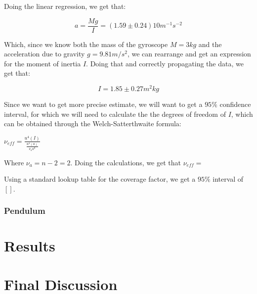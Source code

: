 \documentclass[a4paper,12pt]{article}
\begin{document}
Doing the linear regression, we get that:

\begin{equation}
  \label{result1}
  a = \frac{Mg}{I} = (1.59 \pm 0.24)10 m^{-1}s^{-2}
\end{equation}

Which, since we know both the mass of the gyroscope $M = 3kg$ and the acceleration due to gravity $g = 9.81 m/s^2$, we can rearrange and get an expression for the moment of inertia $I$. Doing that and correctly propagating the data, we get that:

\begin{equation}
  \label{Inertia1}
  I = 1.85 \pm 0.27 m^2kg
\end{equation}

Since we want to get more precise estimate, we will want to get a $95\%$ confidence interval, for which we will need to calculate the the degrees of freedom of $I$, which can be obtained through the Welch-Satterthwaite formula:

$\nu_{eff} = \frac{u^4(I)}{\frac{u^4(a)}{\nu_a a^8}}$

Where $\nu_a = n - 2 = 2$. Doing the calculations, we get that $\nu_{eff} = $

Using a standard lookup table for the coverage factor, we get a $95\%$  interval of $[]$. 


\subsubsection{Pendulum}
\section{Results}

\section{Final Discussion}
\end{document}
